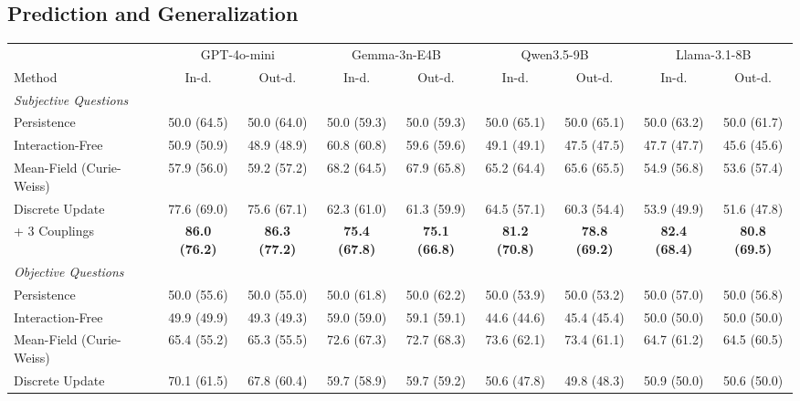 \subsection{Prediction and Generalization}\label{sec:results_prediction}
\begin{table}[t]
\centering
\small
\begin{adjustbox}{max width=\textwidth}
\begin{tabular}{l cc cc cc cc}
\toprule
 & \multicolumn{2}{c}{GPT-4o-mini} & \multicolumn{2}{c}{Gemma-3n-E4B} & \multicolumn{2}{c}{Qwen3.5-9B} & \multicolumn{2}{c}{Llama-3.1-8B} \\
\cmidrule(lr){2-3}\cmidrule(lr){4-5}\cmidrule(lr){6-7}\cmidrule(lr){8-9}
Method & In-d. & Out-d. & In-d. & Out-d. & In-d. & Out-d. & In-d. & Out-d. \\
\midrule
\multicolumn{9}{l}{\textit{Subjective Questions}} \\
\midrule
Persistence & 50.0 (64.5) & 50.0 (64.0) & 50.0 (59.3) & 50.0 (59.3) & 50.0 (65.1) & 50.0 (65.1) & 50.0 (63.2) & 50.0 (61.7) \\
Interaction-Free & 50.9 (50.9) & 48.9 (48.9) & 60.8 (60.8) & 59.6 (59.6) & 49.1 (49.1) & 47.5 (47.5) & 47.7 (47.7) & 45.6 (45.6) \\
Mean-Field (Curie-Weiss) & 57.9 (56.0) & 59.2 (57.2) & 68.2 (64.5) & 67.9 (65.8) & 65.2 (64.4) & 65.6 (65.5) & 54.9 (56.8) & 53.6 (57.4) \\
Discrete Update & 77.6 (69.0) & 75.6 (67.1) & 62.3 (61.0) & 61.3 (59.9) & 64.5 (57.1) & 60.3 (54.4) & 53.9 (49.9) & 51.6 (47.8) \\
\quad + 3 Couplings & \textbf{86.0 (76.2)} & \textbf{86.3 (77.2)} & \textbf{75.4 (67.8)} & \textbf{75.1 (66.8)} & \textbf{81.2 (70.8)} & \textbf{78.8 (69.2)} & \textbf{82.4 (68.4)} & \textbf{80.8 (69.5)} \\
\midrule
\multicolumn{9}{l}{\textit{Objective Questions}} \\
\midrule
Persistence & 50.0 (55.6) & 50.0 (55.0) & 50.0 (61.8) & 50.0 (62.2) & 50.0 (53.9) & 50.0 (53.2) & 50.0 (57.0) & 50.0 (56.8) \\
Interaction-Free & 49.9 (49.9) & 49.3 (49.3) & 59.0 (59.0) & 59.1 (59.1) & 44.6 (44.6) & 45.4 (45.4) & 50.0 (50.0) & 50.0 (50.0) \\
Mean-Field (Curie-Weiss) & 65.4 (55.2) & 65.3 (55.5) & 72.6 (67.3) & 72.7 (68.3) & 73.6 (62.1) & 73.4 (61.1) & 64.7 (61.2) & 64.5 (60.5) \\
Discrete Update & 70.1 (61.5) & 67.8 (60.4) & 59.7 (58.9) & 59.7 (59.2) & 50.6 (47.8) & 49.8 (48.3) & 50.9 (50.0) & 50.6 (50.0) \\

\end{tabular}
\end{adjustbox}
\end{table}
